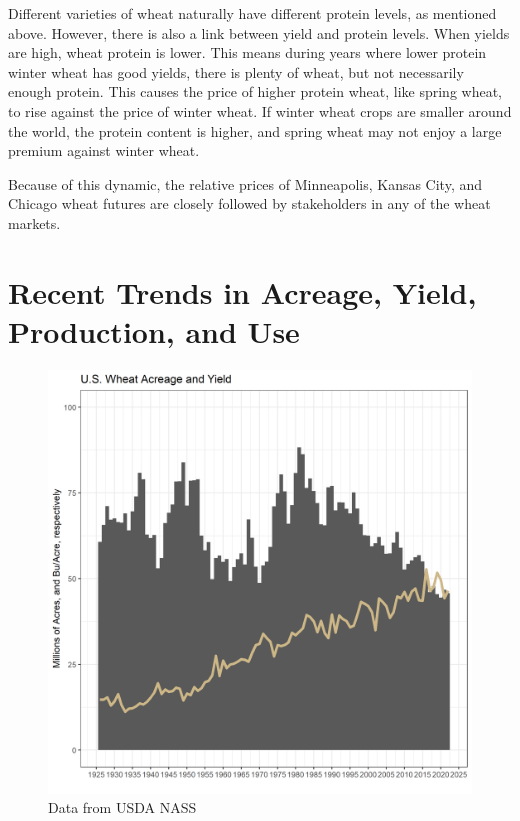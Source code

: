 \documentclass[
  letterpaper,
  DIV=11,
  numbers=noendperiod]{scrreprt}
\begin{document}
Different varieties of wheat naturally have different protein levels, as
mentioned above. However, there is also a link between yield and protein
levels. When yields are high, wheat protein is lower. This means during
years where lower protein winter wheat has good yields, there is plenty
of wheat, but not necessarily enough protein. This causes the price of
higher protein wheat, like spring wheat, to rise against the price of
winter wheat. If winter wheat crops are smaller around the world, the
protein content is higher, and spring wheat may not enjoy a large
premium against winter wheat.

Because of this dynamic, the relative prices of Minneapolis, Kansas
City, and Chicago wheat futures are closely followed by stakeholders in
any of the wheat markets.

\hypertarget{recent-trends-in-acreage-yield-production-and-use-2}{%
\section{Recent Trends in Acreage, Yield, Production, and
Use}\label{recent-trends-in-acreage-yield-production-and-use-2}}

\begin{figure}

{\centering \includegraphics{assets/PrimerforGrain_WheatAcandY.png}

}

\caption{Data from USDA NASS}

\end{figure}
\end{document}
